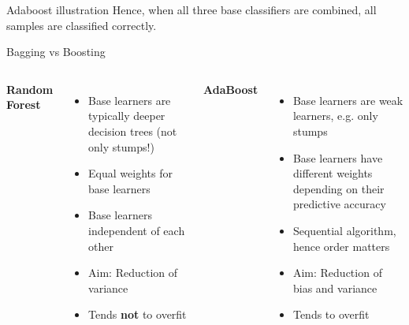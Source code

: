 \begin{vbframe}{Adaboost illustration}
Hence, when all three base classifiers are combined, all samples are classified correctly.



\end{vbframe}










\begin{frame}{Bagging vs Boosting}
\begin{center}
\begin{columns}

 \textbf{Random Forest}
 \begin{itemize}
 \item Base learners are typically deeper decision trees (not only stumps!)
 \item Equal weights for base learners
 \item Base learners independent of each other
 \item Aim: Reduction of variance
 \item Tends \textbf{not} to overfit
 \end{itemize}
 
\textbf{AdaBoost}
\begin{itemize}
\item Base learners are weak learners, e.g. only stumps
\item Base learners have different weights depending on their predictive accuracy
\item Sequential algorithm, hence order matters
\item Aim: Reduction of bias and variance
\item Tends to overfit
\end{itemize}

\end{columns}

\end{center}

\end{frame}

